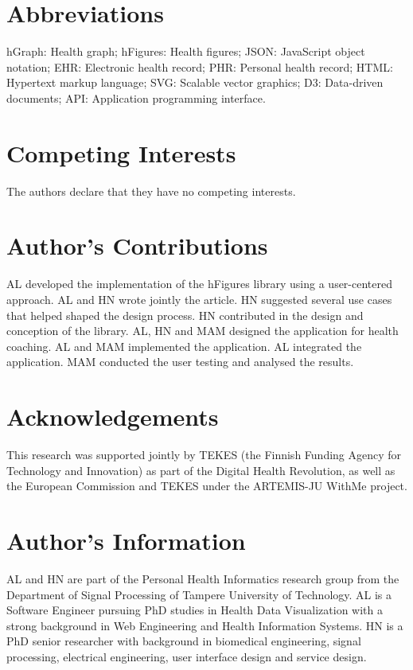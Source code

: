 \documentclass[twocolumn]{bmcart}%
\begin{document}

\begin{backmatter}

\section*{Abbreviations}
    hGraph: Health graph; hFigures: Health figures; JSON: JavaScript object notation; EHR: Electronic health record; PHR: Personal health record; HTML: Hypertext markup language; SVG: Scalable vector graphics; D3: Data-driven documents; API: Application programming interface.

\section*{Competing Interests}
    The authors declare that they have no competing interests.

\section*{Author's Contributions}
AL developed the implementation of the hFigures library using a user-centered approach. AL and HN wrote jointly the article. HN suggested several use cases that helped shaped the design process. HN contributed in the design and conception of the library. AL, HN and MAM designed the application for health coaching. AL and MAM implemented the application. AL integrated the application. MAM conducted the user testing and analysed the results.
    
\section*{Acknowledgements}
This research was supported jointly by TEKES (the Finnish Funding Agency for Technology and Innovation) as part of the Digital Health Revolution, as well as the European Commission and TEKES under the ARTEMIS-JU WithMe project.
  
\section*{Author's Information}
AL and HN are part of the Personal Health Informatics research group from the Department of Signal Processing of Tampere University of Technology. AL is a Software Engineer pursuing PhD studies in Health Data Visualization with a strong background in Web Engineering and Health Information Systems. HN is a PhD senior researcher with background in biomedical engineering, signal processing, electrical engineering, user interface design and service design.


\end{backmatter}
\end{document}
